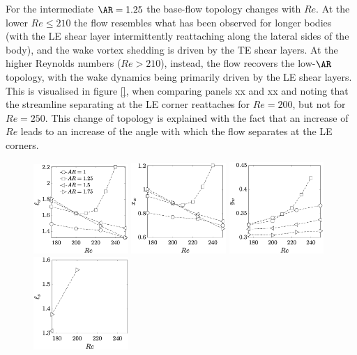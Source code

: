 For the intermediate $\AR=1.25$ the base-flow topology changes with $Re$. At the lower $Re \le 210$ the flow resembles what has been observed for longer bodies (with the LE shear layer intermittently reattaching along the lateral sides of the body), and the wake vortex shedding is driven by the TE shear layers. At the higher Reynolds numbers ($Re>210$), instead, the flow recovers the low-$\AR$ topology, with the wake dynamics being primarily driven by the LE shear layers. This is visualised in figure \ref{}, when comparing panels xx and xx and noting that the streamline separating at the LE corner reattaches for $Re=200$, but not for $Re=250$. This change of topology is explained with the fact that an increase of $Re$ leads to an increase of the angle with which the flow separates at the LE corners.

\begin{figure}
  \centering
  \includegraphics[width=0.32\textwidth]{./fig/AR1s/lw.eps}
  \includegraphics[width=0.32\textwidth]{./fig/AR1s/xw.eps}
  \includegraphics[width=0.32\textwidth]{./fig/AR1s/yw.eps}
  \includegraphics[width=0.32\textwidth]{./fig/AR1s/ls.eps}

\end{figure}
